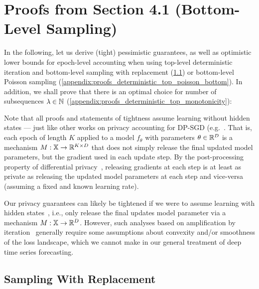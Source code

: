 \section{Proofs from Section 4.1 (Bottom-Level Sampling)}\label{appendix:proofs_bottom_level}

In the following, let us derive (tight) pessimistic guarantees, as well as optimistic lower bounds for epoch-level accounting when using top-level deterministic iteration and bottom-level sampling with replacement (\cref{appendix:proofs_deterministic_top_wr_bottom}) or bottom-level Poisson sampling (\cref{appendix:proofs_deterministic_top_poisson_bottom}).
In addition, we shall prove that there is an optimal choice for number of subsequences $\lambda \in {\mathbb{N}}$  (\cref{appendix:proofs_deterministic_top_monotonicity}):
\deterministictoplevelmonotonicity*

Note that all proofs and statements of tightness assume learning without hidden states --- just like other works on privacy accounting for DP-SGD (e.g.~\cite{abadi2016deep,wang2019uniform,koskela2020computing,gopi2021numerical}.
That is, each epoch of length $K$ applied to a model $f_\theta$ with parameters $\theta \in {\mathbb{R}}^D$ 
is a mechanism $M : {\mathbb{X}} \rightarrow {\mathbb{R}}^{K \times D}$ that does not simply release the final updated model parameters, but the gradient used in each update step.
By the post-processing property of differential privacy~\cite{dwork2006differential,dong2022gaussian}, releasing gradients at each  step is at least as private as releasing the updated model parameters at each step and vice-versa (assuming a fixed and known learning rate). 

Our privacy guarantees can likely be tightened if we were to assume learning with hidden states~\cite{ye2022Iteration}, i.e.,  only release the final updates model parameter via a mechanism $M : {\mathbb{X}} \rightarrow {\mathbb{R}}^D$.
However, such analyses based on amplification by iteration~\cite{feldman2018privacy} generally require some assumptions about convexity and/or smoothness of the loss landscape, which we cannot make in our general treatment of deep time series forecasting.

\subsection{Sampling With Replacement}\label{appendix:proofs_deterministic_top_wr_bottom}

